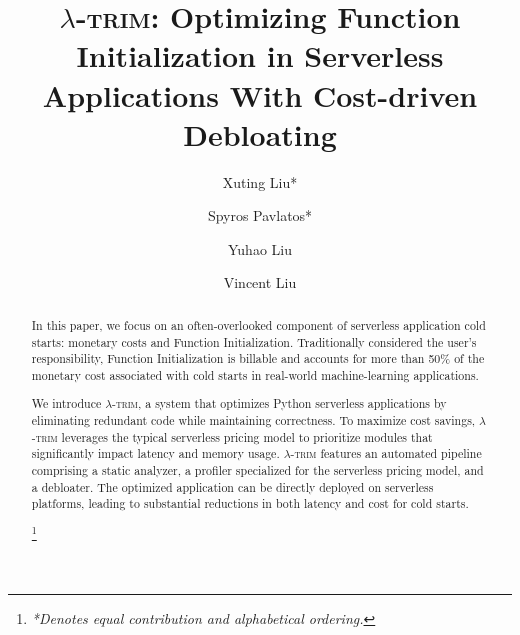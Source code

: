 \documentclass[sigplan,screen]{acmart}
\newcommand{\sys}{\textsc{\ensuremath{\lambda}-trim}\xspace}
\newcommand\blfootnote[1]{\begingroup \renewcommand\thefootnote{}\footnote{#1}\addtocounter{footnote}{-1}\endgroup }
\begin{document}
\date{}



\title[\sys: Optimizing Function Initialization in Serverless Applications]{\texorpdfstring{\boldmath}{}\sys: Optimizing Function Initialization in Serverless Applications With Cost-driven Debloating}



\author{Xuting Liu*}


\author{Spyros Pavlatos*}


\author{Yuhao Liu}


\author{Vincent Liu}

\date{}

\iffalse
\newcommand{\review}[1]{}
\else
\newcommand{\review}[1]{\todo[author=reviewer,color=green!20,inline]{#1}}
\fi


\begin{abstract}



In this paper, we focus on an often-overlooked component of serverless application cold starts: monetary costs and Function Initialization.
Traditionally considered the user's responsibility, Function Initialization is billable and accounts for more than 50\% of the monetary cost associated with cold starts in real-world machine-learning applications.


We introduce \sys, a system that optimizes Python serverless applications by eliminating redundant code while maintaining correctness.
To maximize cost savings, \sys leverages the typical serverless pricing model to prioritize modules that significantly impact latency and memory usage.
\sys features an automated pipeline comprising a static analyzer, a profiler specialized for the serverless pricing model, and a debloater.
The optimized application can be directly deployed on serverless platforms, leading to substantial reductions in both latency and cost for cold starts.


 
\vspace{-1em}

\blfootnote{\textit{*Denotes equal contribution and alphabetical ordering.}}\end{abstract}
\end{document}
